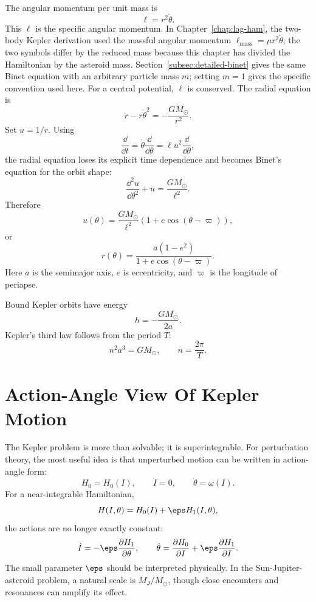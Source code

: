 \begin{derivation}
The angular momentum per unit mass is
\[
  \ell=r^2\dot\theta.
\]
This \(\ell\) is the specific angular momentum. In
Chapter~\ref{chap:lag-ham}, the two-body Kepler derivation used the massful
angular momentum \(\ell_{\mathrm{mass}}=\mu r^2\dot\theta\); the two symbols
differ by the reduced mass because this chapter has divided the Hamiltonian by
the asteroid mass. Section~\ref{subsec:detailed-binet} gives the same Binet
equation with an arbitrary particle mass \(m\); setting \(m=1\) gives the
specific convention used here.
For a central potential, \(\ell\) is conserved. The radial equation is
\[
  \ddot r-r\dot\theta^2=-\frac{GM_\odot}{r^2}.
\]
Set \(u=1/r\). Using
\[
  \frac{\dd}{\dd t}=\dot\theta\frac{\dd}{\dd\theta}
  =
  \ell u^2\frac{\dd}{\dd\theta},
\]
the radial equation loses its explicit time dependence and becomes Binet's
equation for the orbit shape:
\[
  \frac{\dd^2u}{\dd\theta^2}+u=\frac{GM_\odot}{\ell^2}.
\]
Therefore
\[
  u(\theta)=\frac{GM_\odot}{\ell^2}\left(1+e\cos(\theta-\varpi)\right),
\]
or
\[
  \boxed{
  r(\theta)=\frac{a(1-e^2)}{1+e\cos(\theta-\varpi)}
  }.
\]
Here \(a\) is the semimajor axis, \(e\) is eccentricity, and \(\varpi\) is the
longitude of periapse.
\end{derivation}

Bound Kepler orbits have energy
\[
  h=-\frac{GM_\odot}{2a}.
\]
Kepler's third law follows from the period \(T\):
\[
  n^2a^3=GM_\odot,\qquad n=\frac{2\pi}{T}.
\]

\section{Action-Angle View Of Kepler Motion}
\label{sec:kepler-action-angle}

The Kepler problem is more than solvable; it is superintegrable. For
perturbation theory, the most useful idea is that unperturbed motion can be
written in action-angle form:
\[
  H_0=H_0(I),
  \qquad
  \dot I=0,
  \qquad
  \dot\theta=\omega(I).
\]
For a near-integrable Hamiltonian,
\[
  H(I,\theta)=H_0(I)+\eps H_1(I,\theta),
\]
the actions are no longer exactly constant:
\[
  \dot I=-\eps\frac{\partial H_1}{\partial \theta},
  \qquad
  \dot\theta=\frac{\partial H_0}{\partial I}
  +
  \eps\frac{\partial H_1}{\partial I}.
\]
The small parameter \(\eps\) should be interpreted physically. In the
Sun-Jupiter-asteroid problem, a natural scale is \(M_J/M_\odot\), though close
encounters and resonances can amplify its effect.

